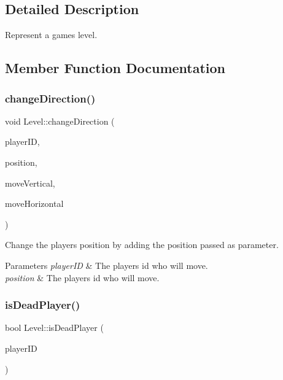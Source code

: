 \subsection{Detailed Description}
Represent a game\textquotesingle{}s level. 

\subsection{Member Function Documentation}
\mbox{\label{classLevel_a7fbf2259277a0be256738886cd82796a}} 
\subsubsection{\texorpdfstring{change\+Direction()}{changeDirection()}}
{\footnotesize\ttfamily void Level\+::change\+Direction (\begin{DoxyParamCaption}\item[{const Unsigned\+Int \&}]{player\+ID,  }\item[{const Vector3d \&}]{position,  }\item[{Float}]{move\+Vertical,  }\item[{Float}]{move\+Horizontal }\end{DoxyParamCaption})}



Change the player\textquotesingle{}s position by adding the position passed as parameter. 


\begin{DoxyParams}{Parameters}
{\em player\+ID} & The player\textquotesingle{}s id who will move. \\
\hline
{\em position} & The player\textquotesingle{}s id who will move. \\
\hline
\end{DoxyParams}
\mbox{\label{classLevel_a0ce4503fce6dd9f1a96036a50743d6c6}} 
\subsubsection{\texorpdfstring{is\+Dead\+Player()}{isDeadPlayer()}}
{\footnotesize\ttfamily bool Level\+::is\+Dead\+Player (\begin{DoxyParamCaption}\item[{const Unsigned\+Int \&}]{player\+ID }\end{DoxyParamCaption})}



